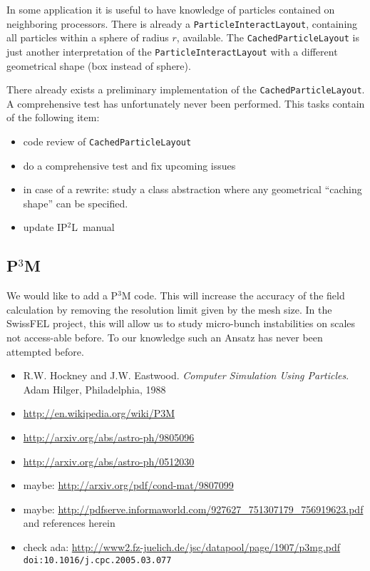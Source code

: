 \documentclass[10pt,a4paper]{scrartcl}
\newcommand{\ippl}{\textsc{IP$^2$L}}
\begin{document}
In some application it is useful to have knowledge of particles contained on
neighboring processors. There is already a \texttt{ParticleInteractLayout},
containing all particles within a sphere of radius $r$, available. The
\texttt{CachedParticleLayout} is just another interpretation of the
\texttt{ParticleInteractLayout} with a different geometrical shape (box instead
of sphere).

There already exists a preliminary implementation of the \texttt{CachedParticleLayout}.
A comprehensive test has unfortunately never been performed. This tasks contain of the following
item:
%
\begin{itemize}
    \item code review of \texttt{CachedParticleLayout}
    \item do a comprehensive test and fix upcoming issues
    \item in case of a rewrite: study a class abstraction where any geometrical ``caching 
    shape'' can be specified. 
    \item update \ippl~manual
\end{itemize}


\subsection{P$^3$M}

We would like to add a P$^3$M code. This will increase the accuracy of the field calculation by
removing the resolution limit given by the mesh size. In the SwissFEL project, this will allow us
to study micro-bunch instabilities on scales not access-able before. To our knowledge such an Ansatz
has never been attempted before. 

\begin{itemize}
    \item R.W. Hockney and J.W. Eastwood. {\it Computer Simulation Using Particles}. Adam Hilger, Philadelphia, 1988
    \item \url{http://en.wikipedia.org/wiki/P3M}
    \item \url{http://arxiv.org/abs/astro-ph/9805096}
    \item \url{http://arxiv.org/abs/astro-ph/0512030}
    \item maybe: \url{http://arxiv.org/pdf/cond-mat/9807099}
    \item maybe: \url{http://pdfserve.informaworld.com/927627_751307179_756919623.pdf} and references herein 
    \item check ada: \url{http://www2.fz-juelich.de/jsc/datapool/page/1907/p3mg.pdf} {\tt doi:10.1016/j.cpc.2005.03.077}
\end{itemize}
\end{document}
